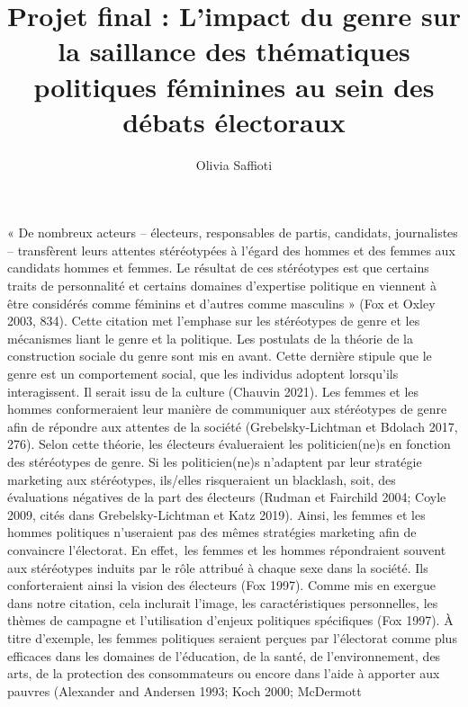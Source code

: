 \documentclass[
  letterpaper,
  DIV=11,
  numbers=noendperiod]{scrartcl}
\title{Projet final : L'impact du genre sur la saillance des thématiques
politiques féminines au sein des débats électoraux}
\author{Olivia Saffioti}
\date{}
\begin{document}
\maketitle
\ifdefined\Shaded\renewenvironment{Shaded}{\begin{tcolorbox}[borderline west={3pt}{0pt}{shadecolor}, frame hidden, enhanced, breakable, boxrule=0pt, sharp corners, interior hidden]}{\end{tcolorbox}}\fi

« De nombreux acteurs -- électeurs, responsables de partis, candidats,
journalistes -- transfèrent leurs attentes stéréotypées à l'égard des
hommes et des femmes aux candidats hommes et femmes. Le résultat de ces
stéréotypes est que certains traits de personnalité et certains domaines
d'expertise politique en viennent à être considérés comme féminins et
d'autres comme masculins » (Fox et Oxley 2003, 834). Cette citation met
l'emphase sur les stéréotypes de genre et les mécanismes liant le genre
et la politique. Les postulats de la théorie de la construction sociale
du genre sont mis en avant. Cette dernière stipule que le genre est un
comportement social, que les individus adoptent lorsqu'ils
interagissent. Il serait issu de la culture (Chauvin 2021). Les femmes
et les hommes conformeraient leur manière de communiquer aux stéréotypes
de genre afin de répondre aux attentes de la société (Grebelsky-Lichtman
et Bdolach 2017, 276). Selon cette théorie, les électeurs évalueraient
les politicien(ne)s en fonction des stéréotypes de genre. Si les
politicien(ne)s n'adaptent par leur stratégie marketing aux stéréotypes,
ils/elles risqueraient un blacklash, soit, des évaluations négatives de
la part des électeurs (Rudman et Fairchild 2004; Coyle 2009, cités dans
Grebelsky-Lichtman et Katz 2019). Ainsi, les femmes et les hommes
politiques n'useraient pas des mêmes stratégies marketing afin de
convaincre l'électorat. En effet,~les femmes et les hommes répondraient
souvent aux stéréotypes induits par le rôle attribué à chaque sexe dans
la société. Ils conforteraient ainsi la vision des électeurs (Fox 1997).
Comme mis en exergue dans notre citation, cela inclurait l'image, les
caractéristiques personnelles, les thèmes de campagne et l'utilisation
d'enjeux politiques spécifiques (Fox 1997). À titre d'exemple, les
femmes politiques seraient perçues par l'électorat comme plus efficaces
dans les domaines de l'éducation, de la santé, de l'environnement, des
arts, de la protection des consommateurs ou encore dans l'aide à
apporter aux pauvres (Alexander and Andersen 1993; Koch 2000; McDermott
\end{document}
